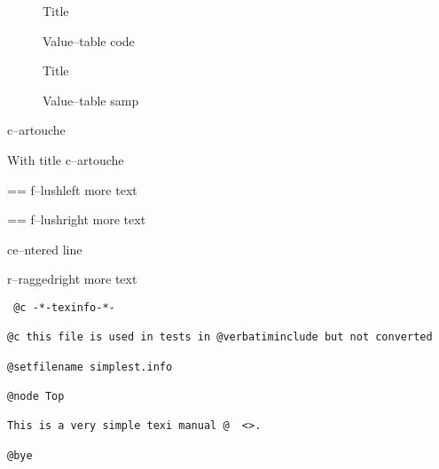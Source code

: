 \documentclass{book}
\makeatletter
\newcommand\Texinfotablestylesamp[1]{\ifstrempty{#1}{}{`\texttt{#1}'}}%
\newenvironment{Texinfopreformatted}{%
  \par\GNUTobeylines\obeyspaces\frenchspacing\parskip=\z@\parindent=\z@}{}
{\catcode`\^^M=13 \gdef\GNUTobeylines{\catcode`\^^M=13 \def^^M{\null\par}}}
\renewcommand{\_}{\Texinfounderscore\discretionary{}{}{}}
\makeatother
\begin{document}
\begin{description}
\item[] Title
\item[{\parbox[b]{\linewidth}{%
\texttt{a{-}{-}code}}}]
Value--table code
\end{description}

\begin{description}
\item[] Title
\item[{\parbox[b]{\linewidth}{%
\Texinfotablestylesamp{a{-}{-}samp}\\
\Texinfotablestylesamp{a2{-}{-}samp}}}]
Value--table samp
\end{description}

\begin{mdframed}[style=Texinfocartouche]
c--artouche
\end{mdframed}

\begin{mdframed}[style=Texinfocartouche, frametitle={Tit--le \emph{of box}}]
With title c--artouche
\end{mdframed}

\begin{flushleft}
\begin{Texinfopreformatted}%
f--lushleft
more text
\end{Texinfopreformatted}
\end{flushleft}

\begin{flushright}
\begin{Texinfopreformatted}%
f--lushright
more text
\end{Texinfopreformatted}
\end{flushright}

\begin{center}
ce--ntered line
\end{center}

\begin{flushleft}
r--raggedright
more text
\end{flushleft}

\begin{verbatim}
 @c -*-texinfo-*-

@c this file is used in tests in @verbatiminclude but not converted

@setfilename simplest.info

@node Top

This is a very simple texi manual @  <>.

@bye
\end{verbatim}
\end{document}
